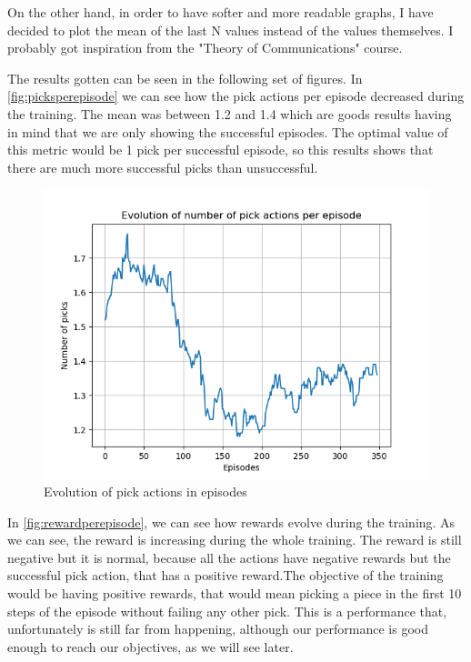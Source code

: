 	On the other hand, in order to have softer and more readable graphs, I have decided to plot the mean of the last N values instead of the values themselves. I probably got inspiration from the "Theory of Communications" course.
	
	The results gotten can be seen in the following set of figures. In \autoref{fig:picksperepisode} we can see how the pick actions per episode decreased during the training. The mean was between 1.2 and 1.4 which are goods results having in mind that we are only showing the successful episodes. The optimal value of this metric would be 1 pick per successful episode, so this results shows that there are much more successful picks than unsuccessful.
	
	\begin{figure}[H]
		\centering
		\includegraphics[width=0.7\linewidth]{Images/original_algorithm/picks_per_episode}
		\caption[Pick actions per episode]{Evolution of pick actions in episodes}
		\label{fig:picksperepisode}
	\end{figure}

	In \autoref{fig:rewardperepisode}, we can see how rewards evolve during the training. As we can see, the reward is increasing during the whole training. The reward is still negative but it is normal, because all the actions have negative rewards but the successful pick action, that has a positive reward.The objective of the training would be having positive rewards, that would mean picking a piece in the first 10 steps of the episode without failing any other pick. This is a performance that, unfortunately is still far from happening, although our performance is good enough to reach our objectives, as we will see later.
	

